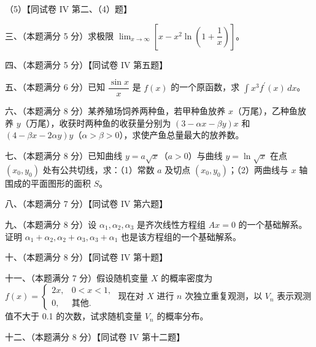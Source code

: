 \documentclass[UTF8,12pt]{ctexart}
\begin{document}
（5）【同试卷 IV 第二、（4）题】


三、（本题满分 5 分）求极限 \(\displaystyle \lim_{x\to\infty}\left[x-x^2\ln\left(1+\dfrac{\displaystyle 1}{\displaystyle x}\right)\right]\)。


四、（本题满分 5 分）【同试卷 IV 第五题】


五、（本题满分 6 分）已知 \(\displaystyle \dfrac{\displaystyle \sin x}{\displaystyle x}\) 是 \(\displaystyle f(x)\) 的一个原函数，求 \(\displaystyle \int x^3f^{\prime}(x)\,dx\)。


六、（本题满分 8 分）某养殖场饲养两种鱼，若甲种鱼放养 \(\displaystyle x\)（万尾），乙种鱼放养 \(\displaystyle y\)（万尾），收获时两种鱼的收获量分别为 \(\displaystyle (3-\alpha x-\beta y)x\) 和 \(\displaystyle (4-\beta x-2\alpha y)y\)（\(\displaystyle \alpha>\beta>0\)），求使产鱼总量最大的放养数。


七、（本题满分 8 分）已知曲线 \(\displaystyle y=a\sqrt x\)（\(\displaystyle a>0\)）与曲线 \(\displaystyle y=\ln\sqrt x\) 在点 \(\displaystyle (x_0,\allowbreak y_0)\) 处有公共切线，求：（1）常数 \(\displaystyle a\) 及切点 \(\displaystyle (x_0,\allowbreak y_0)\)；（2）两曲线与 \(\displaystyle x\) 轴围成的平面图形的面积 \(\displaystyle S\)。


八、（本题满分 7 分）【同试卷 IV 第六题】


九、（本题满分 8 分）设 \(\displaystyle \alpha_1,\allowbreak \alpha_2,\allowbreak \alpha_3\) 是齐次线性方程组 \(\displaystyle Ax=0\) 的一个基础解系。证明 \(\displaystyle \alpha_1+\alpha_2,\allowbreak \alpha_2+\alpha_3,\allowbreak \alpha_3+\alpha_1\) 也是该方程组的一个基础解系。


十、（本题满分 8 分）【同试卷 IV 第十题】


十一、（本题满分 7 分）假设随机变量 \(\displaystyle X\) 的概率密度为 \(\displaystyle f(x)=\begin{cases}2x,\allowbreak &0<x<1,\allowbreak \\0,\allowbreak &\text{其他}.\end{cases}\) 现在对 \(\displaystyle X\) 进行 \(\displaystyle n\) 次独立重复观测，以 \(\displaystyle V_n\) 表示观测值不大于 0.1 的次数，试求随机变量 \(\displaystyle V_n\) 的概率分布。


十二、（本题满分 8 分）【同试卷 IV 第十二题】
\end{document}
